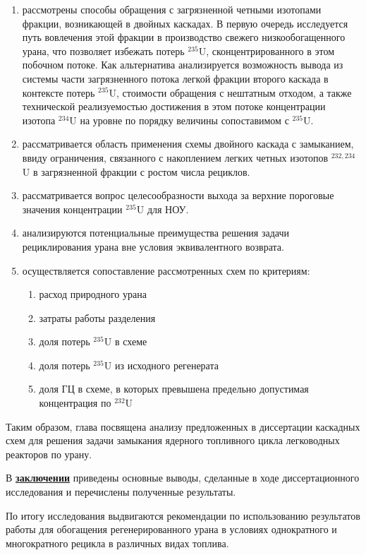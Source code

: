 \begin{enumerate}
  \item рассмотрены способы обращения с загрязненной четными изотопами фракции, возникающей в двойных каскадах. В первую очередь исследуется путь вовлечения этой фракции в производство свежего низкообогащенного урана, что позволяет избежать потерь $^{235}$U, сконцентрированного в этом побочном потоке. Как альтернатива анализируется возможность вывода из системы части загрязненного потока легкой фракции второго каскада в контексте потерь $^{235}$U, стоимости обращения с нештатным отходом, а также технической реализуемостью достижения в этом потоке концентрации изотопа $^{234}$U на уровне по порядку величины сопоставимом с $^{235}$U.
  \item рассматривается область применения схемы двойного каскада с замыканием, ввиду ограничения, связанного с накоплением легких четных изотопов $^{232,234}$U в загрязненной фракции с ростом числа рециклов.
  \item рассматривается вопрос целесообразности выхода за верхние пороговые значения концентрации $^{235}$U для НОУ.
  \item анализируются потенциальные преимущества решения задачи рециклирования урана вне условия эквивалентного возврата.
  \item осуществляется сопоставление рассмотренных схем по критериям:
  \begin{enumerate}
    \item расход природного урана
    \item затраты работы разделения
    \item доля потерь $^{235}$U в схеме
    \item доля потерь $^{235}$U из исходного регенерата
    \item доля ГЦ в схеме, в которых превышена предельно допустимая концентрация по $^{232}$U  
  \end{enumerate}  
\end{enumerate}
Таким образом, глава посвящена анализу предложенных в диссертации каскадных схем для решения задачи замыкания ядерного топливного цикла легководных реакторов по урану. 

В \underline{\textbf{заключении}} приведены основные выводы, сделанные в ходе диссертационного исследования и перечислены полученные результаты.

По итогу исследования выдвигаются рекомендации по использованию результатов работы для обогащения регенерированного урана в условиях однократного и многократного рецикла в различных видах топлива.



\insertbibliofull   



